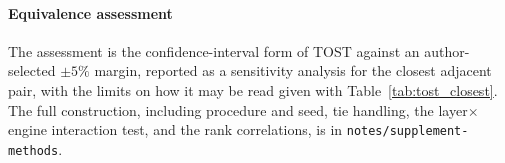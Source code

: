 \documentclass[11pt,a4paper]{article}
\begin{document}
\paragraph{Equivalence assessment} The assessment is the confidence-interval form of TOST against an
author-selected $\pm5\%$ margin, reported as a sensitivity analysis for the closest adjacent pair,
with the limits on how it may be read given with Table~\ref{tab:tost_closest}. The full construction,
including procedure and seed, tie handling, the layer$\times$engine interaction test, and the rank
correlations, is in \texttt{notes/supplement-methods}.
\end{document}
